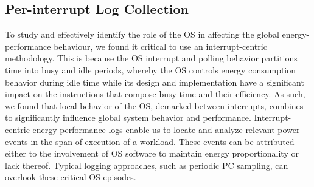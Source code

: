 \subsection{Per-interrupt Log Collection}
\label{sec:log_collect}


To study and effectively identify the role of the OS
in affecting the global energy-performance behaviour,
we found it critical to use an interrupt-centric methodology.
This is because the OS interrupt and polling behavior partitions time
into busy and idle periods,
whereby the OS controls energy consumption behavior during idle time
while its design and implementation have a significant impact
on the instructions that compose busy time and their efficiency.
As such,
we found that local behavior of the OS, demarked between interrupts,
combines to significantly influence global system behavior and performance.
Interrupt-centric energy-performance logs
enable us to locate and analyze relevant power events
in the span of execution of a workload.
These events can be attributed
either to the involvement of OS software to maintain energy proportionality
or lack thereof.
Typical logging approaches,
such as periodic PC sampling,
can overlook these critical OS episodes.


